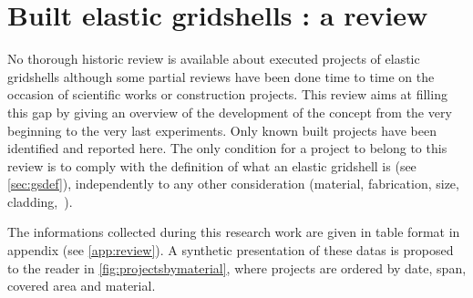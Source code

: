 \clearpage

\section{Built elastic gridshells : a review}\label{sec:review_project}

No thorough historic review is available about executed projects of elastic gridshells although some partial reviews have been done time to time on the occasion of scientific works or construction projects. This review aims at filling this gap by giving an overview of the development of the concept from the very beginning to the very last experiments. Only known built projects have been identified and reported here. The only condition for a project to belong to this review is to comply with the definition of what an elastic gridshell is (see \cref{sec:gsdef}), independently to any other consideration (material, fabrication, size, cladding,~\telp{}).

The informations collected during this research work are given in table format in appendix (see \cref{app:review}). A synthetic presentation of these datas is proposed to the reader in \cref{fig:projectsbymaterial}, where projects are ordered by date, span, covered area and material.

